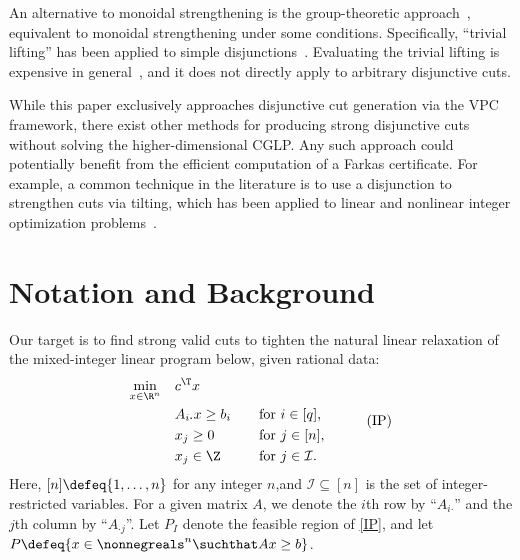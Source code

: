 \documentclass[oribibl,envcountsame]{llncs}
\theoremstyle{remark}
\theoremstyle{definition}
\newcommand{\intvars}{\mathcal{I}}
\newcommand{\PI}{P_{I}}
\newcommand{\numRowsP}{q}
\newcommand{\mxrow}[2]{#1_{#2 \boldsymbol{\cdot}}}
\newcommand{\mxcol}[2]{#1_{\boldsymbol{\cdot} #2}}
\begin{document}
An alternative to monoidal strengthening is the group-theoretic approach~\cite{Johnson74,GomJoh72a},
equivalent to monoidal strengthening under some conditions.
Specifically, ``trivial lifting'' has been applied to simple disjunctions~\cite{Espinoza10,DeyWol10,BasBonCorMar11a,DeyLodTraWol14,XavFukPoi21}.
Evaluating the trivial lifting is expensive in general~\cite{FukPoiXav19}, and it does not directly apply to arbitrary disjunctive cuts.

While this paper exclusively approaches disjunctive cut generation via the VPC framework,
there exist other methods for producing strong disjunctive cuts without solving the higher-dimensional CGLP.
Any such approach could potentially benefit from the efficient computation of a Farkas certificate.
For example, a common technique in the literature is to use a disjunction to strengthen cuts via tilting, which has been applied to linear and nonlinear integer optimization problems~\cite{Perregaard03,KilLinLueMil14,Kazachkov18,KroMis21_disj-cut-strengthening-convex-MINLP}.






\section{Notation and Background}
\label{sec:background}


Our target is to find strong valid cuts to tighten the natural linear relaxation of the mixed-integer linear program below, given rational data:
    \begin{equation}
        \begin{aligned}
          \min_{x \in \R^n} \quad 
            &c^\T x
            \\
            & \mxrow{A}{i} x \ge b_i &\quad& \text{for $i \in [\numRowsP]$,}
            \\
            & x_j \ge 0 &&\text{for $j \in [n]$,}
            \\
            & x_j \in \Z &&\text{for $j \in \intvars$} .
        \end{aligned}
        \label{IP}\tag{IP}
    \end{equation}
Here, $[n] \defeq \{1,\ldots,n\}$ for any integer $n$,and $\intvars \subseteq [n]$ is the set of integer-restricted variables.
For a given matrix $A$, we denote the $i$th row by ``$\mxrow{A}{i}$'' and the $j$th column by ``$\mxcol{A}{j}$''.
Let $\PI$ denote the feasible region of \cref{IP}, and let $P \defeq \{x \in \nonnegreals^n \suchthat Ax \ge b\}$.
\end{document}
